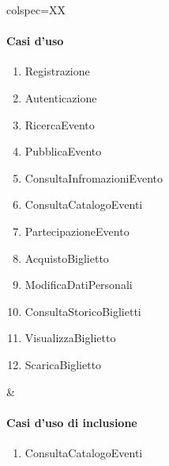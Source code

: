 \begin{table}[!hbp]
	\centering
	\begin{tblr}{colspec=XX}
		\begin{minipage}[t]{\linewidth}
			\paragraph{Casi d'uso}
			\begin{enumerate}
				\item Registrazione 
				\item Autenticazione
				\item RicercaEvento
				\item PubblicaEvento
				\item ConsultaInfromazioniEvento
				\item ConsultaCatalogoEventi
				\item PartecipazioneEvento
				\item AcquistoBiglietto
				\item ModificaDatiPersonali
				\item ConsultaStoricoBiglietti
				\item VisualizzaBiglietto
				\item ScaricaBiglietto
			\end{enumerate}
		\end{minipage} &
		\begin{minipage}[t]{\linewidth}
			\paragraph{Casi d'uso di inclusione}
			\begin{enumerate}
                \item ConsultaCatalogoEventi
			\end{enumerate}

		\end{minipage}
	\end{tblr}
\end{table}
